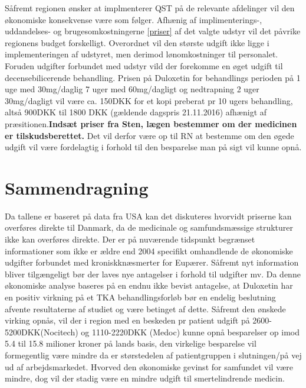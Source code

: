 Såfremt regionen ønsker at implmenterer QST på de relevante afdelinger vil den økonomiske konsekvense være som følger. Afhænig af implimenterings-, uddandelses- og brugesomkostningerne \ref{priser} af det valgte udstyr vil det påvrike regionens budget forskelligt. Overordnet vil den største udgift ikke ligge i implementeringen af udstyret, men derimod lønomkostninger til personalet. Foruden udgifter forbundet med udstyr vild der forekomme en øget udgift til decensebilicerende behandling. Prisen på  Duloxetin for behandlings perioden på 1 uge med 30mg/daglig 7 uger med 60mg/dagligt og nedtrapning 2 uger 30mg/dagligt vil være ca. 150DKK for et kopi preberat pr 10 ugers behandling, altså 900DKK til 1800 DKK (gældende dagspris 21.11.2016)\citep{Medpriser2016} afhænigt af præsitionen.\textbf{Indsæt priser fra Sten, lægen bestemmer om der medicinen er tilskudsberettet.} Det vil derfor være op til RN at bestemme om den øgede udgift vil være fordelagtig i forhold til den besparelse man på sigt vil kunne opnå.


\section{Sammendragning}

Da tallene er baseret på data fra USA kan det diskuteres hvorvidt priserne kan overføres direkte til Danmark, da de medicinale og samfundsmæssige strukturer ikke kan overføres direkte. Der er på nuværende tidspunkt begrænset informationer som ikke er ældre end 2004 specifikt omhandlende de økonomiske udgifter forbundet med kroniskknæsmerter for Eupærer. Såfremt nyt information bliver tilgængeligt bør der laves nye antagelser i forhold til udgifter mv. 
Da denne økonomiske analyse baseres på en endnu ikke bevist antagelse, at Duloxetin har en positiv virkning på et TKA behandlingsforløb bør en endelig beslutning afvente resultaterne af studiet og være betinget af dette. Såfremt den ønskede virking opnås, vil der i region med en beskeden pr patient udgift på 2600-5200DKK(Nocitech) og 1110-2220DKK (Medoc) kunne opnå besparelser op imod 5.4 til 15.8 milioner kroner på lands basis, den virkelige besparelse vil formegentlig være mindre da  er størstedelen af patientgruppen i slutningen/på vej ud af arbejdsmarkedet. Hvorved den økonomiske gevinst for samfundet vil være mindre, dog vil der stadig være en mindre udgift til smertelindrende medicin. 